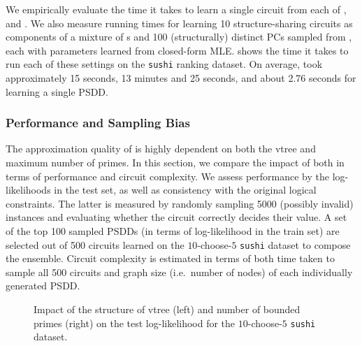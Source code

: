 We empirically evaluate the time it takes to learn a single circuit from each of
,  and . We also measure running times
for learning 10 structure-sharing circuits as components of a mixture of s and
100 (structurally) distinct PCs sampled from , each with parameters learned
from closed-form MLE.  shows the time it takes to run each of these settings
on the \texttt{sushi} ranking dataset. On average,  took approximately \num{15}
seconds,  \num{13} minutes and \num{25} seconds, and 
about \num{2.76} seconds for learning a single PSDD.

\subsubsection{Performance and Sampling Bias}

The approximation quality of  is highly dependent on both the vtree and
maximum number of primes. In this section, we compare the impact of both in terms of performance
and circuit complexity. We assess performance by the log-likelihoods in the test set, as well as
consistency with the original logical constraints. The latter is measured by randomly sampling
\num{5000} (possibly invalid) instances and evaluating whether the circuit correctly decides their
value. A set of the top \num{100} sampled PSDDs (in terms of log-likelihood in the train set) are
selected out of \num{500} circuits learned on the $10$-choose-$5$ \texttt{sushi} dataset to compose
the ensemble. Circuit complexity is estimated in terms of both time taken to sample all 500
circuits and graph size (i.e.\ number of nodes) of each individually generated PSDD.

\begin{figure}[t]
  \begin{subfigure}{0.495\textwidth}
    \caption{}
  \end{subfigure}
  \begin{subfigure}{0.495\textwidth}
    \resizebox{\textwidth}{!}{\texttt{[image: k\_ll]}}
    \caption{}
  \end{subfigure}
  \caption{Impact of the structure of vtree (left) and number of bounded primes (right) on the
    test log-likelihood for the $10$-choose-$5$ \texttt{sushi} dataset.}
  \label{fig:ll-comp}
\end{figure}

